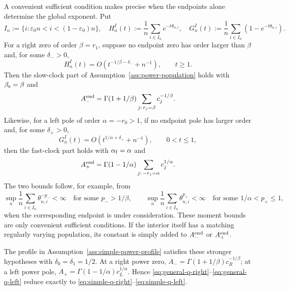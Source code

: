 \documentclass[11pt]{article}
\theoremstyle{remark}
\theoremstyle{plain}
\newcommand{\eps}{\varepsilon}
\begin{document}
A convenient sufficient condition makes precise when the endpoints alone
determine the global exponent.  Put
\[
 I_n:=\{i:\eps_0n<i<(1-\eps_0)n\},\quad
 H_n^I(t):=\frac1n\sum_{i\in I_n}e^{-t\theta_{n,i}},\quad
 G_n^I(t):=\frac1n\sum_{i\in I_n}(1-e^{-t\theta_{n,i}}).
\]
For a right zero of order $\beta=r_1$, suppose no endpoint zero has order
larger than $\beta$ and, for some $\delta_->0$,
\begin{equation}\label{eq:interior-slow-negligible}
 H_n^I(t)=O(t^{-1/\beta-\delta_-}+n^{-1}),\qquad t\ge1.
\end{equation}
Then the slow-clock part of Assumption~\ref{ass:power-population} holds with
$\beta_{\rm s}=\beta$ and
\begin{equation}\label{eq:general-A-minus}
 A_-^{\rm end}=\Gamma(1+1/\beta)
 \sum_{j:\,r_j=\beta}c_j^{-1/\beta}.
\end{equation}
Likewise, for a left pole of order $\alpha=-r_0>1$, if no endpoint pole has
larger order and, for some $\delta_+>0$,
\begin{equation}\label{eq:interior-fast-negligible}
 G_n^I(t)=O(t^{1/\alpha+\delta_+}+n^{-1}),\qquad 0<t\le1,
\end{equation}
then the fast-clock part holds with $\alpha_{\rm f}=\alpha$ and
\begin{equation}\label{eq:general-A-plus}
 A_+^{\rm end}=\Gamma(1-1/\alpha)
 \sum_{j:\,-r_j=\alpha}c_j^{1/\alpha}.
\end{equation}
The two bounds follow, for example, from
\begin{equation}\label{eq:interior-moment-sufficient}
 \sup_n\frac1n\sum_{i\in I_n}\theta_{n,i}^{-p_-}<\infty
 \quad\text{for some }p_->1/\beta,
 \qquad
 \sup_n\frac1n\sum_{i\in I_n}\theta_{n,i}^{p_+}<\infty
 \quad\text{for some }1/\alpha<p_+\le1,
\end{equation}
when the corresponding endpoint is under consideration.  These moment
bounds are only convenient sufficient conditions.  If the interior itself
has a matching regularly varying population, its constant is simply added
to $A_-^{\rm end}$ or $A_+^{\rm end}$.

The profile in Assumption~\ref{ass:simple-power-profile} satisfies these
stronger hypotheses with $\delta_0=\delta_1=1/2$.  At a right power zero,
$A_-=\Gamma(1+1/\beta)c_R^{-1/\beta}$; at a left power pole,
$A_+=\Gamma(1-1/\alpha)c_L^{1/\alpha}$.  Hence
\eqref{eq:general-q-right}--\eqref{eq:general-q-left} reduce exactly to
\eqref{eq:simple-q-right}--\eqref{eq:simple-q-left}.
\end{document}
